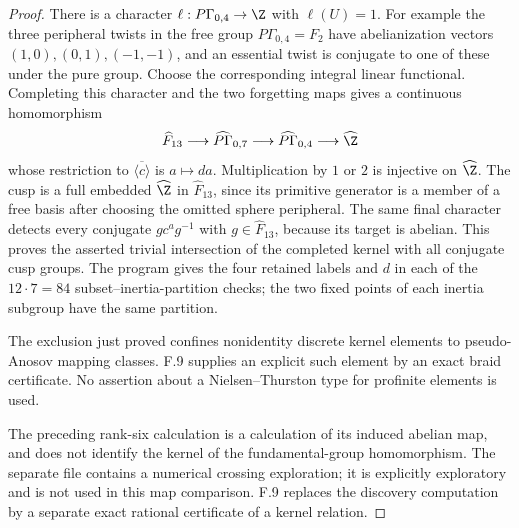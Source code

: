 \begin{proof}
There is a character
$\ell:P\Gamma_{0,4}\to\Z$ with $\ell(U)=1$.
For example the three peripheral twists in the
free group $P\Gamma_{0,4}=F_2$ have abelianization
vectors $(1,0),(0,1),(-1,-1)$, and an essential
twist is conjugate to one of these under the pure
group.  Choose the corresponding integral linear
functional.  Completing this character and the
two forgetting maps gives a continuous homomorphism
\[
 \widehat F_{13}\longrightarrow
 \widehat{P\Gamma}_{0,7}\longrightarrow
 \widehat{P\Gamma}_{0,4}\longrightarrow\widehat\Z
\]
whose restriction to $\overline{\langle c\rangle}$
is $a\mapsto da$.  Multiplication by $1$ or $2$
is injective on $\widehat\Z$.  The cusp is a full
embedded $\widehat\Z$ in $\widehat F_{13}$, since
its primitive generator is a member of a free
basis after choosing the omitted sphere peripheral.
The same final character detects every conjugate
$g c^a g^{-1}$ with $g\in\widehat F_{13}$, because
its target is abelian.  This proves the asserted
trivial intersection of the completed kernel with
all conjugate cusp groups.  The program gives the
four retained labels and $d$ in each of the
$12\cdot7=84$ subset--inertia-partition checks;
the two fixed points of each inertia subgroup
have the same partition.

The exclusion just proved confines nonidentity discrete
kernel elements to pseudo-Anosov mapping classes. F.9 supplies
an explicit such element by an exact braid certificate.
No assertion about a Nielsen--Thurston type for profinite
elements is used.

The preceding rank-six calculation is a calculation
of its induced abelian map, and does not identify
the kernel of the fundamental-group homomorphism.
The separate file
contains a numerical crossing exploration; it is
explicitly exploratory and is not used in this
map comparison. F.9 replaces the discovery computation
by a separate exact rational certificate of a kernel relation.
\end{proof}
